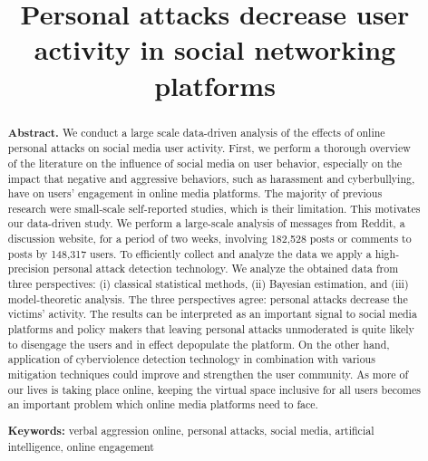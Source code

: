 \documentclass[10pt,dvipsnames]{scrartcl}
\title{Personal attacks decrease user activity in social networking platforms}
\author{}
\date{\vspace{-2.5em}}
\begin{document}
\maketitle

\vspace{-2mm}

\begin{abstract}
\noindent \textbf{Abstract.} 
We conduct a large scale data-driven analysis of the effects of online personal attacks on social media user activity. First, we perform a thorough overview of the literature on the influence of social media on user behavior, especially on the impact that negative and aggressive behaviors, such as harassment and cyberbullying, have on users’ engagement in online media platforms. The majority of previous research were  small-scale self-reported studies, which is their limitation. This motivates our data-driven study. We perform a large-scale analysis of messages from Reddit, a discussion website, for a period of two weeks, involving 182,528 posts or comments to posts by 148,317 users. To efficiently collect and analyze the data we apply a high-precision personal attack detection technology. We analyze the obtained data from three perspectives: (i) classical statistical methods, (ii) Bayesian estimation, and (iii) model-theoretic analysis. The three perspectives agree: personal attacks decrease the victims’ activity.
The results can be interpreted as an important signal to social media platforms and policy makers that leaving personal attacks unmoderated is quite likely to disengage the users and in effect depopulate the platform. On the other hand, application of cyberviolence detection technology in combination with various mitigation techniques could improve and strengthen the user community. As more of our lives is taking place online, keeping the virtual space inclusive for all users becomes an important problem which online media platforms need to face.


\vspace{4mm}


\noindent \textbf{Keywords:} verbal aggression online, personal attacks, social media, artificial intelligence, online engagement



\vspace{4mm}



\end{abstract}
\end{document}
